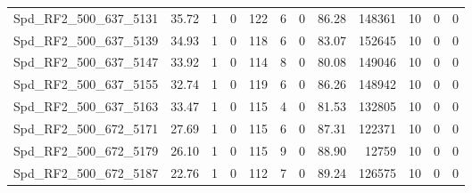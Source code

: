 \begin{longtable}[c]{@{}lrrrrrrrrrrr@{}}
Spd\_RF2\_500\_637\_5131      & 35.72                  & 1                       & 0                       & 122                    & 6                       & 0                       & 86.28                   & 148361                   & 10                       & 0                        & 0                        \\
Spd\_RF2\_500\_637\_5139      & 34.93                  & 1                       & 0                       & 118                    & 6                       & 0                       & 83.07                   & 152645                   & 10                       & 0                        & 0                        \\
Spd\_RF2\_500\_637\_5147      & 33.92                  & 1                       & 0                       & 114                    & 8                       & 0                       & 80.08                   & 149046                   & 10                       & 0                        & 0                        \\
Spd\_RF2\_500\_637\_5155      & 32.74                  & 1                       & 0                       & 119                    & 6                       & 0                       & 86.26                   & 148942                   & 10                       & 0                        & 0                        \\
Spd\_RF2\_500\_637\_5163      & 33.47                  & 1                       & 0                       & 115                    & 4                       & 0                       & 81.53                   & 132805                   & 10                       & 0                        & 0                        \\
Spd\_RF2\_500\_672\_5171      & 27.69                  & 1                       & 0                       & 115                    & 6                       & 0                       & 87.31                   & 122371                   & 10                       & 0                        & 0                        \\
Spd\_RF2\_500\_672\_5179      & 26.10                  & 1                       & 0                       & 115                    & 9                       & 0                       & 88.90                   & 12759                    & 10                       & 0                        & 0                        \\
Spd\_RF2\_500\_672\_5187      & 22.76                  & 1                       & 0                       & 112                    & 7                       & 0                       & 89.24                   & 126575                   & 10                       & 0                        & 0                        \\

\end{longtable}

